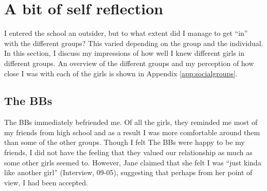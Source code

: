 




  


\section{A bit of self reflection}

I entered the school an outsider, but to what extent did I manage to get ``in'' with the different groups?  This varied depending on the group and the individual. In this section, I discuss my impressions of how well I knew different girls in different groups. An overview of the different groups and my perception of how close I was with each of the girls is shown in Appendix \ref{app:socialgroups}.

\subsection{The BBs}
The BBs immediately befriended me. Of all the girls, they reminded me most of my friends from high school and as a result I was more comfortable around them than some of the other groups. Though I felt The BBs were happy to be my friends, I did not have the feeling that they valued our relationship as much as some other girls seemed to. However, Jane claimed that she felt I was ``just kinda like another girl'' (Interview, 09-05), suggesting that perhaps from her point of view, I had been accepted.

